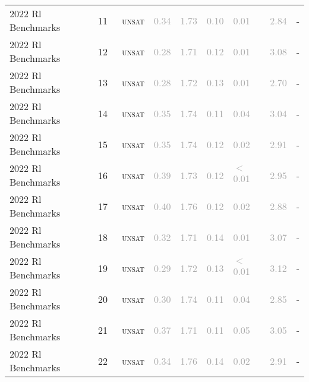 \begin{center}
{\begin{longtable}{@{}lllllllll@{}}
2022 Rl Benchmarks & 11 & ~\textsc{unsat} & \textcolor{darkgray}{0.34} & \textcolor{darkgray}{1.73} & \textcolor{darkgray}{0.10} & \textcolor{darkgray}{0.01} & \textcolor{darkgray}{2.84} & - \\
2022 Rl Benchmarks & 12 & ~\textsc{unsat} & \textcolor{darkgray}{0.28} & \textcolor{darkgray}{1.71} & \textcolor{darkgray}{0.12} & \textcolor{darkgray}{0.01} & \textcolor{darkgray}{3.08} & - \\
2022 Rl Benchmarks & 13 & ~\textsc{unsat} & \textcolor{darkgray}{0.28} & \textcolor{darkgray}{1.72} & \textcolor{darkgray}{0.13} & \textcolor{darkgray}{0.01} & \textcolor{darkgray}{2.70} & - \\
2022 Rl Benchmarks & 14 & ~\textsc{unsat} & \textcolor{darkgray}{0.35} & \textcolor{darkgray}{1.74} & \textcolor{darkgray}{0.11} & \textcolor{darkgray}{0.04} & \textcolor{darkgray}{3.04} & - \\
2022 Rl Benchmarks & 15 & ~\textsc{unsat} & \textcolor{darkgray}{0.35} & \textcolor{darkgray}{1.74} & \textcolor{darkgray}{0.12} & \textcolor{darkgray}{0.02} & \textcolor{darkgray}{2.91} & - \\
2022 Rl Benchmarks & 16 & ~\textsc{unsat} & \textcolor{darkgray}{0.39} & \textcolor{darkgray}{1.73} & \textcolor{darkgray}{0.12} & \textcolor{darkgray}{$<$0.01} & \textcolor{darkgray}{2.95} & - \\
2022 Rl Benchmarks & 17 & ~\textsc{unsat} & \textcolor{darkgray}{0.40} & \textcolor{darkgray}{1.76} & \textcolor{darkgray}{0.12} & \textcolor{darkgray}{0.02} & \textcolor{darkgray}{2.88} & - \\
2022 Rl Benchmarks & 18 & ~\textsc{unsat} & \textcolor{darkgray}{0.32} & \textcolor{darkgray}{1.71} & \textcolor{darkgray}{0.14} & \textcolor{darkgray}{0.01} & \textcolor{darkgray}{3.07} & - \\
2022 Rl Benchmarks & 19 & ~\textsc{unsat} & \textcolor{darkgray}{0.29} & \textcolor{darkgray}{1.72} & \textcolor{darkgray}{0.13} & \textcolor{darkgray}{$<$0.01} & \textcolor{darkgray}{3.12} & - \\
2022 Rl Benchmarks & 20 & ~\textsc{unsat} & \textcolor{darkgray}{0.30} & \textcolor{darkgray}{1.74} & \textcolor{darkgray}{0.11} & \textcolor{darkgray}{0.04} & \textcolor{darkgray}{2.85} & - \\
2022 Rl Benchmarks & 21 & ~\textsc{unsat} & \textcolor{darkgray}{0.37} & \textcolor{darkgray}{1.71} & \textcolor{darkgray}{0.11} & \textcolor{darkgray}{0.05} & \textcolor{darkgray}{3.05} & - \\
2022 Rl Benchmarks & 22 & ~\textsc{unsat} & \textcolor{darkgray}{0.34} & \textcolor{darkgray}{1.76} & \textcolor{darkgray}{0.14} & \textcolor{darkgray}{0.02} & \textcolor{darkgray}{2.91} & - \\

\end{longtable}}
\end{center}
